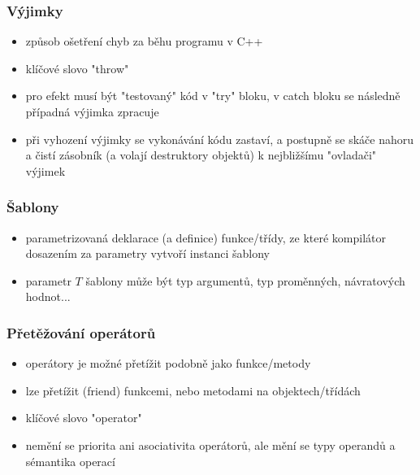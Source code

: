 \subsubsection*{Výjimky}
\begin{itemize}
	\item způsob ošetření chyb za běhu programu v C++
	\item klíčové slovo "throw"
	\item pro efekt musí být "testovaný" kód v "try" bloku, v catch bloku se následně případná výjimka zpracuje
	\item při vyhození výjimky se vykonávání kódu zastaví, a postupně se skáče nahoru a čistí zásobník (a volají destruktory objektů) k nejbližšímu "ovladači" výjimek
\end{itemize}

\subsubsection*{Šablony}
\begin{itemize}
	\item parametrizovaná deklarace (a definice) funkce/třídy, ze které kompilátor dosazením za parametry vytvoří instanci šablony
	\item parametr $T$ šablony může být typ argumentů, typ proměnných, návratových hodnot...
\end{itemize}

\subsubsection*{Přetěžování operátorů}
\begin{itemize}
	\item operátory je možné přetížit podobně jako funkce/metody
	\item lze přetížit (friend) funkcemi, nebo metodami na objektech/třídách
	\item klíčové slovo "operator"
	\item nemění se priorita ani asociativita operátorů, ale mění se typy operandů a sémantika operací
\end{itemize}

